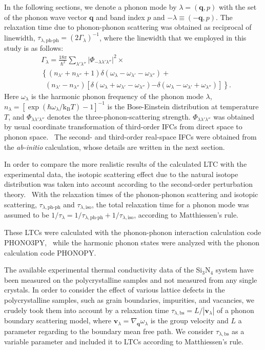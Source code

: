 \documentclass[twocolumn,amsmath,amssymb,a4paper,prb,superscriptaddress,floatfix]{revtex4-1}
\begin{document}
In the following sections, we denote a phonon mode by $\lambda=(\mathbf{q},p)$
with the set of the phonon wave vector $\mathbf{q}$ and band index $p$ and $-\lambda \equiv (-\mathbf{q},p)$. The
relaxation time due to phonon-phonon scattering was obtained as reciprocal of
linewidth, $\tau_{\lambda,\text{ph-ph}}=(2\Gamma_\lambda)^{-1}$, where the
linewidth that we employed in this study is as follows:
\begin{align}
 \label{eq:linewidth}
 &\Gamma_\lambda = \frac{18\pi}{\hbar^2}
  \sum_{\lambda' \lambda''}
  \bigl|\Phi_{-\lambda\lambda'\lambda''}\bigl|^2 \times \nonumber \\ 
 &\left\{ (n_{\lambda'} + n_{\lambda''}+1) 
   \delta(\omega_\lambda-\omega_{\lambda'}-\omega_{\lambda''}) \right.
   + \nonumber \\ 
 &\;\;(n_{\lambda'}-n_{\lambda''})
  \left[\delta(\omega_\lambda +\omega_{\lambda'}-\omega_{\lambda''})
 \right. 
 \left. -\left. \delta(\omega_\lambda - \omega_{\lambda'}+\omega_{\lambda''})
 \right]\right\}.
\end{align}
Here $\omega_\lambda$ is the harmonic phonon frequency of the phonon mode
$\lambda$, $n_\lambda=[\exp(\hbar\omega_\lambda/\mathrm{k_B}T)-1]^{-1}$ is
the Bose-Einstein distribution at temperature $T$, and
$\Phi_{\lambda\lambda'\lambda''}$ denotes the three-phonon-scattering strength.
$\Phi_{\lambda\lambda'\lambda''}$ was obtained by usual coordinate
transformation of third-order IFCs from direct space to phonon
space.~\cite{phono3py} The second- and third-order real-space IFCs
were obtained from the {\it ab-initio} calculation, whose details are written in the
next section.

In order to compare the more realistic results of the calculated LTC with the
experimental data, the isotopic scattering effect due to the natural isotope
distribution was taken into account according to the second-order perturbation
theory.~\cite{tamura} With the relaxation times of the phonon-phonon scattering
and isotopic scattering, $\tau_{\lambda,\text{ph-ph}}$ and
$\tau_{\lambda,\text{iso}}$, the total relaxation time for a phonon mode was
assumed to be $1/\tau_{\lambda} = 1/\tau_{\lambda,\text{ph-ph}} +
1/\tau_{\lambda,\text{iso}}$, according to Matthiessen's rule.

These LTCs were calculated with the phonon-phonon interaction calculation code
PHONO3PY,~\cite{phono3py} while the harmonic phonon states were analyzed with
the phonon calculation code PHONOPY.~\cite{phonopy} 

The available experimental thermal conductivity data of the Si$_3$N$_4$ system
have been measured on the polycrystalline samples and not measured from any
single crystals. In order to consider the effect of various lattice defects in
the polycrystalline samples, such as grain boundaries, impurities, and
vacancies, we crudely took them into account by a relaxation time
$\tau_{\lambda,\text{bs}}=L/|\mathbf{v}_\lambda|$ of a phonon boundary
scattering model, where $\mathbf{v}_\lambda =
\nabla_{\mathbf{q}}\omega_\lambda$ is the group velocity and $L$ a
parameter regarding to the boundary mean free path. We consider
$\tau_{\lambda,\text{bs}}$ as a variable parameter and included it to
LTCs according to Matthiessen's rule.
\end{document}
